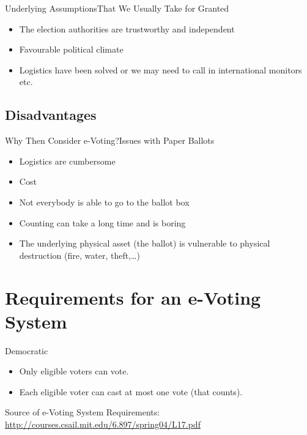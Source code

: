 \documentclass[utf8]{beamer}
\begin{document}
\begin{frame}{Underlying Assumptions}{That We Usually Take for Granted}

  \begin{itemize}
  \item<1->The election authorities are trustworthy and independent
  \item<2->Favourable political climate
  \item<3->Logistics have been solved \pause or we may need to call in
    international monitors etc.
  \end{itemize}

\end{frame}

\subsection{Disadvantages}

\begin{frame}{Why Then Consider e-Voting?}{Issues with Paper Ballots}

  \begin{itemize}
  \item Logistics are cumbersome
  \item Cost
  \item Not everybody is able to go to the ballot box
  \item Counting can take a long time and is boring
  \item The underlying physical asset (the ballot) is vulnerable to
    physical destruction (fire, water, theft,\ldots)
  \end{itemize}

\end{frame}

\section{Requirements for an e-Voting System}

\begin{frame}{Democratic}

  \begin{itemize}
  \item Only eligible voters can vote.
  \item Each eligible voter can cast at most one vote (that counts).
  \end{itemize}

\vfill

Source of e-Voting System Requirements:
\url{http://courses.csail.mit.edu/6.897/spring04/L17.pdf}

\end{frame}
\end{document}
